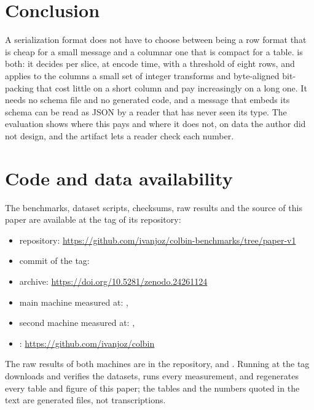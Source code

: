 \section{Conclusion}
\label{sec:conclusion}

A serialization format does not have to choose between being a row format
that is cheap for a small message and a columnar one that is compact for a
table. \colbin{} is both: it decides per slice, at encode time, with a
threshold of eight rows, and applies to the columns a small set of integer
transforms and byte-aligned bit-packing that cost little on a short column
and pay increasingly on a long one. It needs no schema file and no generated
code, and a message that embeds its schema can be read as JSON by a reader
that has never seen its type.
The evaluation shows where this pays and where it does not, on data the
author did not design, and the artifact lets a reader check each number.

\section{Code and data availability}
\label{sec:availability}

The benchmarks, dataset scripts, checksums, raw results and the source of
this paper are available at the tag  of its repository:
\begin{itemize}
\item repository: \url{https://github.com/ivanjoz/colbin-benchmarks/tree/paper-v1}
\item commit of the tag: 
\item archive: \url{https://doi.org/10.5281/zenodo.24261124}
\item main machine measured at: ,
  \colbin{} 
\item second machine measured at: ,
  \colbin{} 
\item \colbin{}: \url{https://github.com/ivanjoz/colbin}
\end{itemize}
The raw results of both machines are in the repository,
 and .
Running  at the tag downloads and verifies the
datasets, runs every measurement, and regenerates every table and figure of
this paper; the tables and the numbers quoted in the text are generated
files, not transcriptions.
